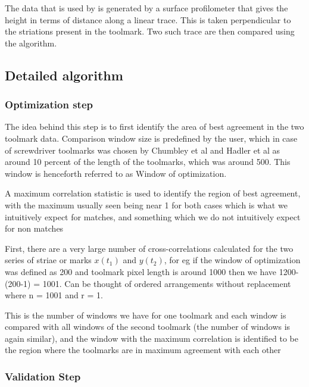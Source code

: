\documentclass[12pt]{article}
\begin{document}
The data that is used by \citet{chumbley} is generated by a surface
profilometer that gives the height in terms of distance along a linear
trace. This is taken perpendicular to the striations present in the
toolmark. Two such trace are then compared using the algorithm.

\subsection{Detailed algorithm}\label{detailed-algorithm}

\subsubsection{Optimization step}\label{optimization-step}

The idea behind this step is to first identify the area of best
agreement in the two toolmark data. Comparison window size is predefined
by the user, which in case of screwdriver toolmarks was chosen by
Chumbley et al and Hadler et al as around 10 percent of the length of
the toolmarks, which was around 500. This window is henceforth referred
to as Window of optimization.

A maximum correlation statistic is used to identify the region of best
agreement, with the maximum usually seen being near 1 for both cases
which is what we intuitively expect for matches, and something which we
do not intuitively expect for non matches


First, there are a very large number of cross-correlations calculated
for the two series of striae or marks \(x(t_1)\) and \(y(t_2)\), for eg
if the window of optimization was defined as 200 and toolmark pixel
length is around 1000 then we have 1200-(200-1) = 1001. Can be thought
of ordered arrangements without replacement where n = 1001 and r = 1.

This is the number of windows we have for one toolmark and each window
is compared with all windows of the second toolmark (the number of
windows is again similar), and the window with the maximum correlation
is identified to be the region where the toolmarks are in maximum
agreement with each other

\subsubsection{Validation Step}\label{validation-step}
\end{document}
